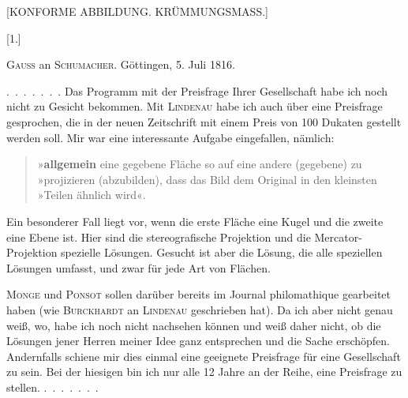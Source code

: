 \clearpage
{}%
\begin{center}\large [KONFORME ABBILDUNG. KRÜMMUNGSMASS.]\end{center}
\begin{center}[1.]\end{center}
\begin{center}\textsc{Gauss} an \textsc{Schumacher}. Göttingen, 5. Juli 1816.\end{center}

\mbox{. . . . . . .} Das Programm mit der Preisfrage Ihrer Gesellschaft habe ich noch nicht zu Gesicht bekommen. Mit \textsc{Lindenau} habe ich auch über eine Preisfrage gesprochen, die in der neuen Zeitschrift mit einem Preis von 100 Dukaten gestellt werden soll. Mir war eine interessante Aufgabe eingefallen, nämlich:
\begin{quote}\small
\noindent »\textbf{allgemein} eine gegebene Fläche so auf eine andere (gegebene) zu\\
»projizieren (abzubilden), dass das Bild dem Original in den kleinsten\\
»Teilen ähnlich wird«.
\end{quote}

Ein besonderer Fall liegt vor, wenn die erste Fläche eine Kugel und die zweite eine Ebene ist. Hier sind die stereografische Projektion und die Mercator-Projektion spezielle Lösungen. Gesucht ist aber die  Lösung, die alle speziellen Lösungen umfasst, und zwar für jede Art von Flächen.

\textsc{Monge} und \textsc{Ponsot} sollen darüber bereits im Journal philomathique gearbeitet haben (wie \textsc{Burckhardt} an \textsc{Lindenau} geschrieben hat). Da ich aber nicht genau weiß, wo, habe ich noch nicht nachsehen können und weiß daher nicht, ob die Lösungen jener Herren meiner Idee ganz entsprechen und die Sache erschöpfen. Andernfalls schiene mir dies einmal eine geeignete Preisfrage für eine Gesellschaft zu sein. Bei der hiesigen bin ich nur alle 12 Jahre an der Reihe, eine Preisfrage zu stellen. \mbox{. . . . . . .}
